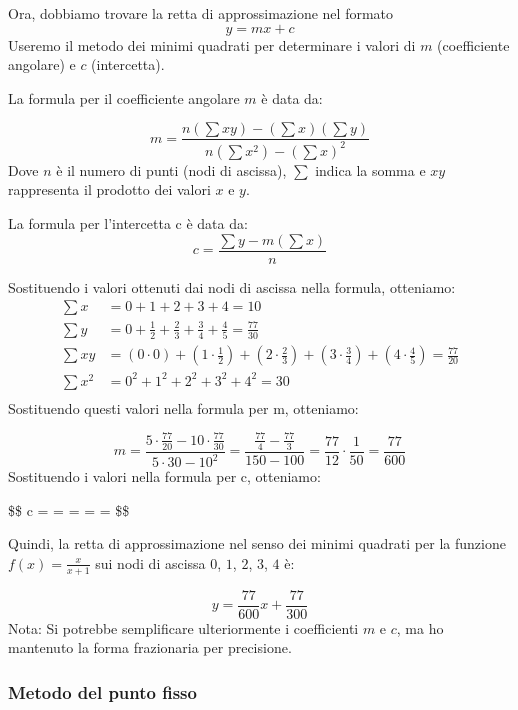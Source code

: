 \documentclass[
]{article}
\begin{document}
Ora, dobbiamo trovare la retta di approssimazione nel formato
\[y = mx + c\] Useremo il metodo dei minimi quadrati per determinare i
valori di \(m\) (coefficiente angolare) e \(c\) (intercetta).

La formula per il coefficiente angolare \(m\) è data da:

\[
m = \frac{n(\sum xy) - (\sum x)(\sum y)}{n(\sum x^2) - (\sum x)^2}
\] Dove \(n\) è il numero di punti (nodi di ascissa), \(\sum\) indica la
somma e \(xy\) rappresenta il prodotto dei valori \(x\) e \(y\).

La formula per l'intercetta c è data da: \[
c = \frac{\sum y - m(\sum x)}{n}
\]

Sostituendo i valori ottenuti dai nodi di ascissa nella formula,
otteniamo: \[
\begin{align*}
\sum x &= 0 + 1 + 2 + 3 + 4 = 10 \\
\sum y &= 0 + \frac{1}{2} + \frac{2}{3} + \frac{3}{4} + \frac{4}{5} = \frac{77}{30} \\
\sum xy &= (0 \cdot 0) + (1 \cdot \frac{1}{2}) + (2 \cdot \frac{2}{3}) + (3 \cdot \frac{3}{4}) + (4 \cdot \frac{4}{5}) = \frac{77}{20} \\
\sum x^2 &= 0^2 + 1^2 + 2^2 + 3^2 + 4^2 = 30 \\
\end{align*}
\] Sostituendo questi valori nella formula per m, otteniamo:

\[
m = \frac{5 \cdot \frac{77}{20} - 10 \cdot \frac{77}{30}}{5 \cdot 30 - 10^2} = \frac{\frac{77}{4} - \frac{77}{3}}{150 - 100} = \frac{77}{12} \cdot \frac{1}{50} = \frac{77}{600}
\] Sostituendo i valori nella formula per c, otteniamo:

\$\$ c =  =
 =  =
 \cdot {} =  \$\$

Quindi, la retta di approssimazione nel senso dei minimi quadrati per la
funzione \(f(x) = \frac{x}{x+1}\) sui nodi di ascissa \(0\), \(1\),
\(2\), \(3\), \(4\) è:

\[
y = \frac{77}{600}x + \frac{77}{300}
\] Nota: Si potrebbe semplificare ulteriormente i coefficienti \(m\) e
\(c\), ma ho mantenuto la forma frazionaria per precisione.

\subsubsection{Metodo del punto fisso}\label{metodo-del-punto-fisso}
\end{document}
